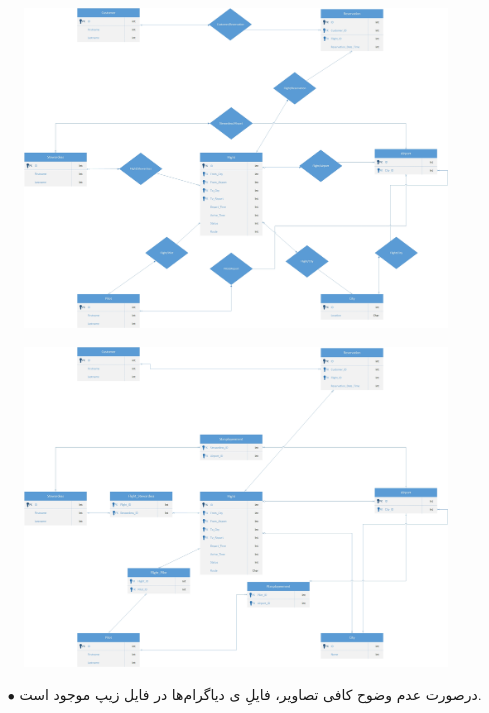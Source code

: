 \documentclass{article}
\begin{document}
\begin{figure}[H]
    \centering
    \includegraphics[width=1\textwidth]{figures/D3.jpg}
    \caption
	{
	}
    \label{fig:fig1}
\end{figure}
\begin{figure}[H]
    \centering
    \includegraphics[width=1\textwidth]{figures/D4.jpg}
    \caption
	{
	}
    \label{fig:fig1}
\end{figure}
\begin{itemize}
    \item [$\bullet$] درصورت عدم وضوح کافی تصاویر، فایلِ ی دیاگرام‌ها در فایل زیپ موجود است.
\end{itemize}
\end{document}
